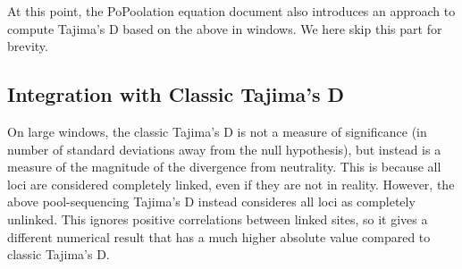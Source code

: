 \documentclass[letterpaper,fontsize=9pt,DIV=12]{scrartcl}
\newcounter{todo}
\newcommand\todo[1]{}
\begin{document}
At this point, the PoPoolation equation document also introduces an approach to compute Tajima's D based on the above in windows.
We here skip this part for brevity.







\subsection{Integration with Classic Tajima's D}
\label{supp:sec:TajimaD:sub:Classic}

On large windows, the classic Tajima's D is not a measure of significance (in number of standard deviations away from the null hypothesis), but instead is a measure of the magnitude of the divergence from neutrality.  This is because all loci are considered completely linked, even if they are not in reality.  However, the above pool-sequencing Tajima's D instead consideres all loci as completely unlinked. This ignores positive correlations between linked sites, so it gives a different numerical result that has a much higher absolute value compared to classic Tajima's D.
\end{document}
